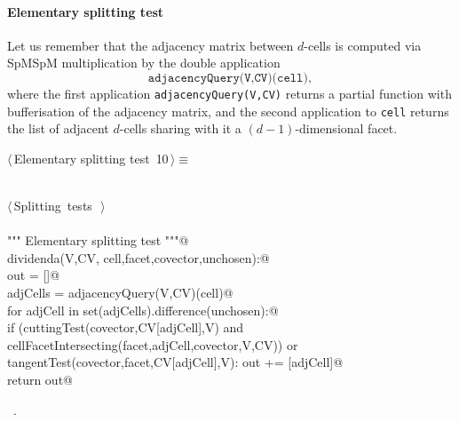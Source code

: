 \documentclass[11pt,oneside]{article}	%
\begin{document}
\paragraph{Elementary splitting test}

Let us remember that the adjacency matrix between $d$-cells is computed via SpMSpM multiplication by the double application 
\[
\texttt{adjacencyQuery(V,CV)(cell)}, 
\] 
where the first application \texttt{adjacencyQuery(V,CV)}
returns a partial function with bufferisation of the adjacency matrix, and the second application to \texttt{cell} returns the list of adjacent $d$-cells sharing with it a $(d-1)$-dimensional facet.

\begin{flushleft} \small \label{scrap9}
\protect{}$\langle\,$Elementary splitting test\nobreak\ {\footnotesize 10}$\,\rangle\equiv$
\vspace{-1ex}
\begin{list}{}{} \item
\mbox{}\verb@@\\
\mbox{}\verb@@\hbox{$\langle\,$Splitting tests\nobreak\ {\footnotesize {}}$\,\rangle$}\verb@@\\
\mbox{}\verb@@\\
\mbox{}\verb@""" Elementary splitting test """@\\
\mbox{}\verb@def dividenda(V,CV, cell,facet,covector,unchosen):@\\
\mbox{}\verb@   out = []@\\
\mbox{}\verb@   adjCells = adjacencyQuery(V,CV)(cell)@\\
\mbox{}\verb@   for adjCell in set(adjCells).difference(unchosen):@\\
\mbox{}\verb@      if (cuttingTest(covector,CV[adjCell],V) and \@\\
\mbox{}\verb@         cellFacetIntersecting(facet,adjCell,covector,V,CV)) or \@\\
\mbox{}\verb@         tangentTest(covector,facet,CV[adjCell],V): out += [adjCell]@\\
\mbox{}\verb@   return out@\\
\mbox{}\verb@@{\NWsep}
\end{list}
\vspace{-1ex}
\footnotesize\addtolength{\baselineskip}{-1ex}
\begin{list}{}{\setlength{\itemsep}{-\parsep}\setlength{\itemindent}{-\leftmargin}}
\item \NWtxtMacroRefIn\ .
\end{list}
\end{flushleft}
\end{document}
